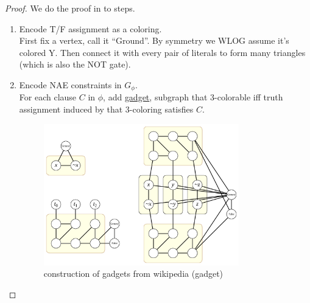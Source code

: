\documentclass{article}
\begin{document}
\begin{proof}
  We do the proof in to steps.

  \begin{enumerate}
    \item Encode T/F assignment as a coloring. \\
    First fix a vertex, call it ``Ground''. By symmetry we WLOG assume it's colored Y. Then connect it with every pair of literals to form many triangles (which is also the NOT gate).


    \item Encode NAE constraints in \(G_{\phi}\). \\
    For each clause \(C\) in \(\phi\), add \ul{gadget}, subgraph that 3-colorable iff truth assignment induced by that 3-coloring satisfies \(C\).

    \begin{figure}[h]
      \centering
      \includegraphics[width=0.8\textwidth]{assets/3SAT-3COL_reduction.pdf}
      \caption{construction of gadgets from wikipedia (gadget)}
    \end{figure}
  \end{enumerate}
\end{proof}
\end{document}
